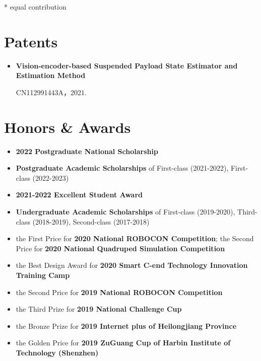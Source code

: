 \documentclass[11pt,a4paper,sans]{moderncv}        %
\begin{document}
{\begin{itemize}
\footnotesize{* equal contribution}
\end{itemize}

\section{Patents}

\vspace{5pt}

\begin{itemize}

    \item{\textbf{Vision-encoder-based Suspended Payload State Estimator and Estimation Method}
    
    CN112991443A，2021.
    }

\end{itemize}

\section{Honors \& Awards}

\vspace{6pt}

\begin{itemize}

    \item {\textbf{2022 Postgraduate National Scholarship}}

\item{\textbf{Postgraduate Academic Scholarships} of First-class (2021-2022), First-class (2022-2023)}
\item {\textbf{2021-2022 Excellent Student Award}}
\item{\textbf{Undergraduate Academic Scholarships} of First-class (2019-2020), Third-class (2018-2019), Second-class (2017-2018)}

\item{the First Price for \textbf{2020 National ROBOCON Competition}; the Second Price for \textbf{2020 National Quadruped Simulation Competition}}

\item {the Best Design Award for \textbf{2020 Smart C-end Technology Innovation Training Camp}}

\item{the Second Price for \textbf{2019 National ROBOCON Competition}}

\item{the Third Prize for \textbf{2019 National Challenge Cup}}

\item{the Bronze Prize for \textbf{2019 Internet plus of Heilongjiang Province}}
\item{the Golden Price for \textbf{2019 ZuGuang Cup of Harbin Institute of Technology (Shenzhen)}}


\end{itemize}}
\end{document}
